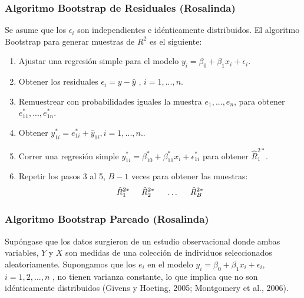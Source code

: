 \subsubsection{Algoritmo Bootstrap de Residuales (Rosalinda)}

Se asume que los $ \epsilon_{i} $ son independientes e idénticamente distribuidos. El algoritmo Bootstrap para generar muestras de $ R^{2} $ es el siguiente:

\begin{enumerate}
		\item Ajustar una regresión simple para el modelo $ y_{i} = \beta_{0} +\beta_{1}x_{i} + \epsilon_{i} $.
		
		\item Obtener los residuales $ \epsilon_{i} = y - \hat{y}   $
		, $i = 1,..., n $.
		
		\item  Remuestrear con probabilidades iguales la muestra $ e_{1},...,e_{n} $, para obtener $e^{*}_{11},...,e^{*}_{1n}$.
		\item Obtener $ y^{*}_{1i} = e^{*}_{1i} + \hat{y}_{1i}, i = 1, ..., n. $.
		
		\item Correr una regresión simple $ y^{*}_{1i} = \beta^{*}_{10} +\beta^{*}_{11}x_{i} + \epsilon^{*}_{1i} $ para obtener $ \hat{R}^{2*}_{1} $.
		
		\item Repetir los pasos 3 al 5, $B - 1$ veces para obtener las muestras: 
		\[
		\hat{R}^{2*}_{1} \hspace{.5cm} \hat{R}^{2*}_{2} \hspace{.5cm} \dots \hspace{.5cm} \hat{R}^{2*}_{B}
		\]
\end{enumerate}


\subsubsection{Algoritmo Bootstrap Pareado (Rosalinda)}

Supóngase que los datos surgieron de un estudio observacional donde ambas variables, $Y$ y $X$ son medidas de una colección de individuos seleccionados aleatoriamente. Supongamos que los $e_{i}$ en el modelo
$ y_{i} = \beta_{0} +\beta_{1}x_{i} + \epsilon_{i}$,    $i=1,2,..., n$ , no tienen varianza constante, lo que implica que no son idénticamente distribuidos (Givens y Hoeting, 2005; Montgomery et al., 2006).

